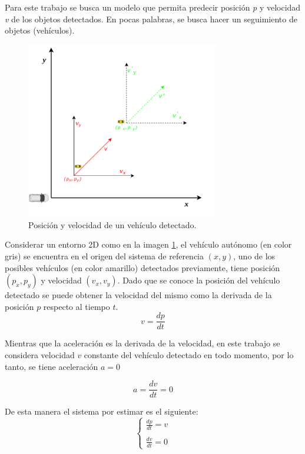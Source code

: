 Para este trabajo se busca un modelo que permita predecir posición \textit{p} y velocidad \textit{v} de los objetos detectados. En pocas palabras, se busca hacer un seguimiento de objetos (vehículos).
\begin{figure}[h]
    \centering
    \includegraphics[width=0.75\textwidth]{Figures/Figures_Cap05/ekf_pose_velocity.pdf}
    \caption{Posición y velocidad de un vehículo detectado.}
    \label{fig:ekf_pose_velocity}
\end{figure}

Considerar un entorno 2D como en la imagen \ref{fig:ekf_pose_velocity}, el vehículo autónomo (en color gris) se encuentra en el origen del sistema de referencia $(x, y)$, uno de los posibles vehículos (en color amarillo) detectados previamente, tiene posición $(p_x, p_y)$ y velocidad $(v_x, v_y)$. Dado que se conoce la posición del vehículo detectado se puede obtener la velocidad del mismo como la derivada de la posición $p$ respecto al tiempo $t$. 
\begin{equation*}
    v = \frac{dp}{dt}
\end{equation*}

Mientras que la aceleración es la derivada de la velocidad, en este trabajo se considera velocidad $v$ constante del vehículo detectado en todo momento, por lo tanto, se tiene aceleración $a = 0$

\begin{equation*}
    a = \frac{dv}{dt} = 0
\end{equation*}

De esta manera el sistema por estimar es el siguiente:
\begin{equation*}
    \left\lbrace
    \begin{array}{ll}
        \frac{dp}{dt} = v \\
        \\
        \frac{dv}{dt} = 0
    \end{array}
    \right.
\end{equation*}

